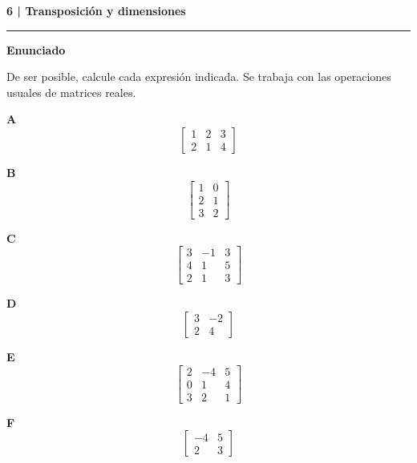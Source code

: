 \documentclass[11pt,a4paper,landscape]{article}
\newcommand{\titulo}[1]{{\LARGE\bfseries #1}\par\smallskip\hrule\medskip}
\begin{document}
\newpage{}\hypertarget{1.2-6}{}
\titulo{6 | Transposición y dimensiones}
\textbf{Enunciado}\par De ser posible, calcule cada expresión indicada. Se trabaja con las operaciones usuales de matrices reales.
\par\smallskip \begin{minipage}[t]{.47\linewidth}\centering \textbf{A}\[\begin{bmatrix}1 & 2 & 3\\2 & 1 & 4\end{bmatrix}\]\end{minipage}\hfill\begin{minipage}[t]{.47\linewidth}\centering \textbf{B}\[\begin{bmatrix}1 & 0\\2 & 1\\3 & 2\end{bmatrix}\]\end{minipage}\par\smallskip
\par\smallskip \begin{minipage}[t]{.47\linewidth}\centering \textbf{C}\[\begin{bmatrix}3 & -1 & 3\\4 & 1 & 5\\2 & 1 & 3\end{bmatrix}\]\end{minipage}\hfill\begin{minipage}[t]{.47\linewidth}\centering \textbf{D}\[\begin{bmatrix}3 & -2\\2 & 4\end{bmatrix}\]\end{minipage}\par\smallskip
\par\smallskip \begin{minipage}[t]{.47\linewidth}\centering \textbf{E}\[\begin{bmatrix}2 & -4 & 5\\0 & 1 & 4\\3 & 2 & 1\end{bmatrix}\]\end{minipage}\hfill\begin{minipage}[t]{.47\linewidth}\centering \textbf{F}\[\begin{bmatrix}-4 & 5\\2 & 3\end{bmatrix}\]\end{minipage}\par\smallskip
\end{document}
